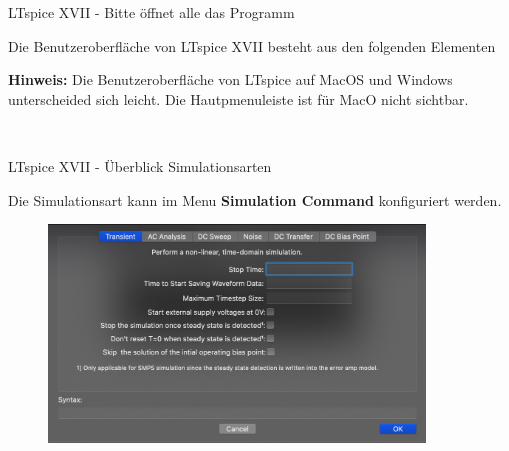 \documentclass{beamer}
\begin{document}
\begin{frame}[fragile]{LTspice XVII - Bitte öffnet alle das Programm}

  Die Benutzeroberfläche von LTspice XVII besteht aus den folgenden Elementen
  \begin{spacing}{0.6} \begin{tiny} \textbf{Hinweis:} Die Benutzeroberfläche von LTspice auf MacOS und Windows unterscheided sich leicht.
      Die Hautpmenuleiste ist für MacO nicht sichtbar.
    \end{tiny} \end{spacing}

  \begin{figure}
    \centering
    \\
    \qquad
  \end{figure}

\end{frame}

\begin{frame}{LTspice XVII - Überblick Simulationsarten}

  Die Simulationsart kann im Menu \textbf{Simulation Command} konfiguriert werden.

  \begin{figure}
    \centering
    \includegraphics[width=10cm]{pictures/simulationcmd.png}
  \end{figure}

\end{frame}
\end{document}
